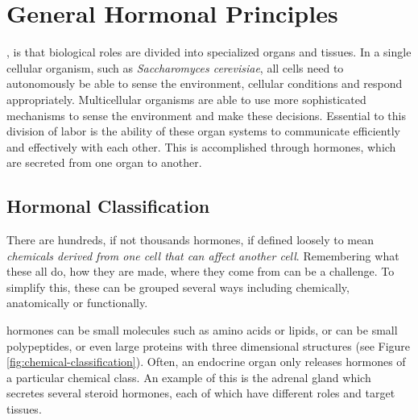 \documentclass{tufte-handout}
\begin{document}
\section{General Hormonal Principles}
, is that biological roles are divided into specialized organs and tissues.  In a single cellular organism, such as \textit{Saccharomyces cerevisiae}, all cells need to autonomously be able to sense the environment, cellular conditions and respond appropriately.  Multicellular organisms are able to use more sophisticated mechanisms to sense the environment and make these decisions.  Essential to this division of labor is the ability of these organ systems to communicate efficiently and effectively with each other.  This is accomplished through hormones, which are secreted from one organ to another.

\subsection{Hormonal Classification}

There are hundreds, if not thousands hormones, if defined loosely to mean \emph{chemicals derived from one cell that can affect another cell}.  Remembering what these all do, how they are made, where they come from can be a challenge.  To simplify this, these can be grouped several ways including chemically, anatomically or functionally.  

 hormones can be small molecules such as amino acids or lipids, or can be small polypeptides, or even large proteins with three dimensional structures (see Figure \ref{fig:chemical-classification}).  Often, an endocrine organ only releases hormones of a particular chemical class.  An example of this is the adrenal gland which secretes several steroid hormones, each of which have different roles and target tissues.
\end{document}

